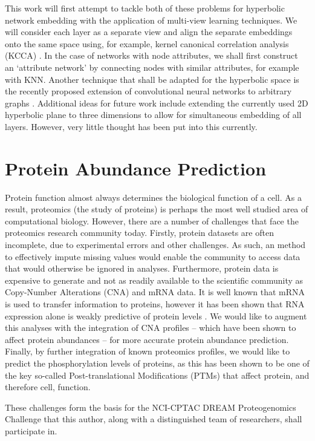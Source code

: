 \documentclass{report}
\begin{document}
	This work will first attempt to tackle both of these problems for hyperbolic network embedding with the application of multi-view learning techniques. We will consider each layer as a separate view and align the separate embeddings onto the same space using, for example, kernel canonical correlation analysis (KCCA) \cite{hardoon2004canonical}. In the case of networks with node attributes, we shall first construct an `attribute network' by connecting nodes with similar attributes, for example with KNN. Another technique that shall be adapted for the hyperbolic space is the recently proposed extension of convolutional neural networks to arbitrary graphs \cite{niepert2016learning}. Additional ideas for future work include extending the currently used 2D hyperbolic plane to three dimensions to allow for simultaneous embedding of all layers. However, very little thought has been put into this currently.
	
		
	\section{Protein Abundance Prediction}
	
	Protein function almost always determines the biological function of a cell. As a result, proteomics (the study of proteins) is perhaps the most well studied area of computational biology. However, there are a number of challenges that face the proteomics research community today. Firstly, protein datasets are often incomplete, due to experimental errors and other challenges. As such, an method to effectively impute missing values would enable the community to access data that would otherwise be ignored in analyses. Furthermore, protein data is expensive to generate and not as readily available to the scientific community as Copy-Number Alterations (CNA) and mRNA data. It is well known that mRNA is used to transfer information to proteins, however it has been shown that RNA expression alone is weakly predictive of protein levels \cite{vogel2012insights}. We would like to augment this analyses with the integration of CNA profiles -- which have been shown to affect protein abundances \cite{zhang2016integrated} -- for more accurate protein abundance prediction. Finally, by further integration of known proteomics profiles, we would like to predict the phosphorylation levels of proteins, as this has been shown to be one of the key so-called Post-translational Modifications (PTMs) that affect protein, and therefore cell, function. 
	
	These challenges form the basis for the NCI-CPTAC DREAM Proteogenomics Challenge that this author, along with a distinguished team of researchers, shall participate in. 
	
\end{document}
